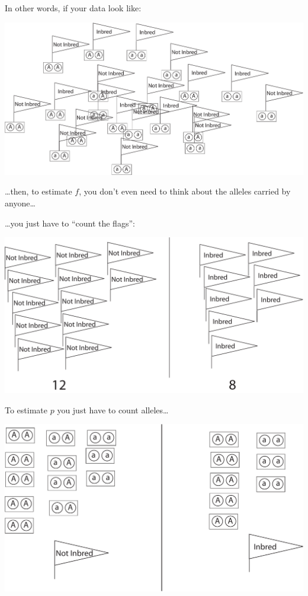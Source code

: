 \newpage

In other words, if your data look like:
\begin{center}
\includegraphics[width=.9\textwidth]{illus/InbreedingLotsOfFlags.pdf}
\end{center}
\ldots then, to estimate $f$, you don't even need to think about the alleles carried by anyone\ldots

\newpage
\ldots you just have to ``count the flags'':
\begin{center}
\includegraphics[width=\textwidth]{illus/InbreedingFlagsOnly.pdf}
\end{center}



\newpage
To estimate $p$ you just have to count alleles\ldots
\begin{center}
\includegraphics[width=\textwidth]{illus/InbreedingEstimating_p_1.pdf}
\end{center}

